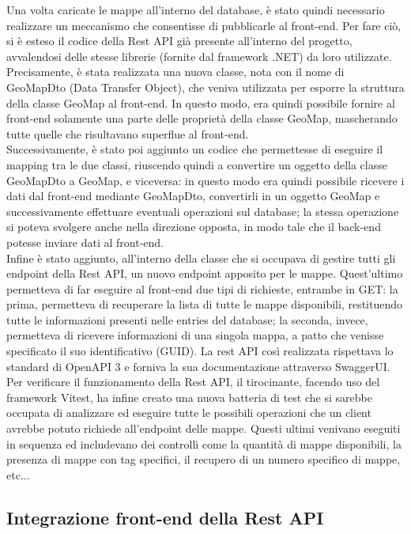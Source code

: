 Una volta caricate le mappe all'interno del database, è stato quindi necessario realizzare un meccanismo che consentisse di pubblicarle al front-end. Per fare ciò, si è esteso il codice della Rest API già presente all'interno del progetto, avvalendosi delle stesse librerie (fornite dal framework .NET) da loro utilizzate. Precisamente, è stata realizzata una nuova classe, nota con il nome di GeoMapDto (Data Transfer Object), che veniva utilizzata per esporre la struttura della classe GeoMap al front-end. In questo modo, era quindi possibile fornire al front-end solamente una parte delle proprietà della classe GeoMap, mascherando tutte quelle che risultavano superflue al front-end.
\\Successivamente, è stato poi aggiunto un codice che permettesse di eseguire il mapping tra le due classi, riuscendo quindi a convertire un oggetto della classe GeoMapDto a GeoMap, e viceversa: in questo modo era quindi possibile ricevere i dati dal front-end mediante GeoMapDto, convertirli in un oggetto GeoMap e successivamente effettuare eventuali operazioni sul database; la stessa operazione si poteva svolgere anche nella direzione opposta, in modo tale che il back-end potesse inviare dati al front-end. 
\\Infine è stato aggiunto, all'interno della classe che si occupava di gestire tutti gli endpoint della Rest API, un nuovo endpoint apposito per le mappe. Quest'ultimo permetteva di far eseguire al front-end due tipi di richieste, entrambe in GET: la prima, permetteva di recuperare la lista di tutte le mappe disponibili, restituendo tutte le informazioni presenti nelle entries del database; la seconda, invece, permetteva di ricevere informazioni di una singola mappa, a patto che venisse specificato il suo identificativo (GUID). 
La rest API così realizzata rispettava lo standard di OpenAPI 3 e  forniva la sua documentazione attraverso SwaggerUI.
\medskip
\\Per verificare il funzionamento della Rest API, il tirocinante, facendo uso del framework Vitest, ha infine creato una nuova batteria di test che si sarebbe occupata di analizzare ed eseguire tutte le possibili operazioni che un client avrebbe potuto richiede all'endpoint delle mappe. Questi ultimi venivano eseguiti in sequenza ed includevano dei controlli come la quantità di mappe disponibili, la presenza di mappe con tag specifici, il recupero di un numero specifico di mappe, etc...

\subsection{Integrazione front-end della Rest API}

